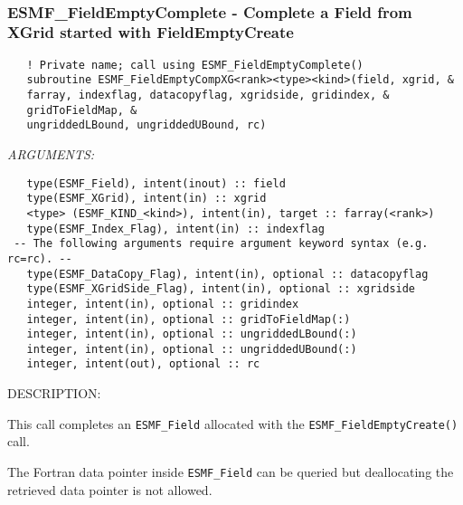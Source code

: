 
\mbox{}\hrulefill\ 
 
\subsubsection [ESMF\_FieldEmptyComplete] {ESMF\_FieldEmptyComplete - Complete a Field from XGrid started with FieldEmptyCreate }


   
\begin{verbatim}   ! Private name; call using ESMF_FieldEmptyComplete() 
   subroutine ESMF_FieldEmptyCompXG<rank><type><kind>(field, xgrid, & 
   farray, indexflag, datacopyflag, xgridside, gridindex, & 
   gridToFieldMap, & 
   ungriddedLBound, ungriddedUBound, rc) 
   \end{verbatim}{\em ARGUMENTS:}
\begin{verbatim}   type(ESMF_Field), intent(inout) :: field 
   type(ESMF_XGrid), intent(in) :: xgrid 
   <type> (ESMF_KIND_<kind>), intent(in), target :: farray(<rank>) 
   type(ESMF_Index_Flag), intent(in) :: indexflag 
 -- The following arguments require argument keyword syntax (e.g. rc=rc). --
   type(ESMF_DataCopy_Flag), intent(in), optional :: datacopyflag 
   type(ESMF_XGridSide_Flag), intent(in), optional :: xgridside 
   integer, intent(in), optional :: gridindex 
   integer, intent(in), optional :: gridToFieldMap(:) 
   integer, intent(in), optional :: ungriddedLBound(:) 
   integer, intent(in), optional :: ungriddedUBound(:) 
   integer, intent(out), optional :: rc 
   \end{verbatim}
{\sf DESCRIPTION:\\ }

 
   This call completes an {\tt ESMF\_Field} allocated with the 
   {\tt ESMF\_FieldEmptyCreate()} call. 
   
   The Fortran data pointer inside {\tt ESMF\_Field} can be queried but deallocating 
   the retrieved data pointer is not allowed. 
   
